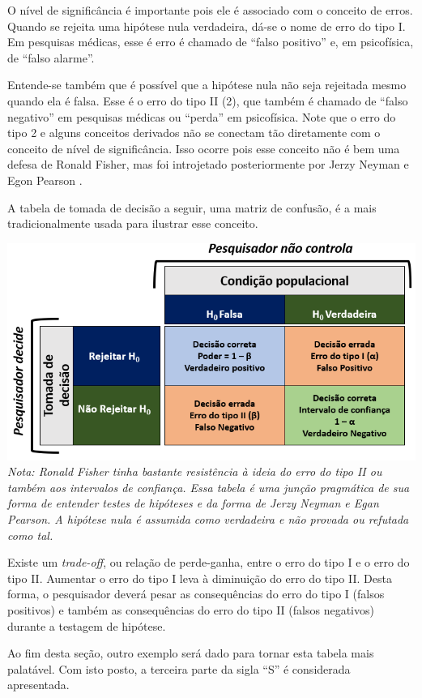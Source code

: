 \documentclass[
]{book}
\begin{document}
O nível de significância é importante pois ele é associado com o conceito de erros. Quando se rejeita uma hipótese nula verdadeira, dá-se o nome de erro do tipo I. Em pesquisas médicas, esse é erro é chamado de ``falso positivo'' e, em psicofísica, de ``falso alarme''.

Entende-se também que é possível que a hipótese nula não seja rejeitada mesmo quando ela é falsa. Esse é o erro do tipo II (2), que também é chamado de ``falso negativo'' em pesquisas médicas ou ``perda'' em psicofísica. Note que o erro do tipo 2 e alguns conceitos derivados não se conectam tão diretamente com o conceito de nível de significância. Isso ocorre pois esse conceito não é bem uma defesa de Ronald Fisher, mas foi introjetado posteriormente por Jerzy Neyman e Egon Pearson \citep{cohen2013explaining}.

A tabela de tomada de decisão a seguir, uma matriz de confusão, é a mais tradicionalmente usada para ilustrar esse conceito.

\includegraphics{./img/cap_inferencia_tabela_decisao.png}
\emph{Nota: Ronald Fisher tinha bastante resistência à ideia do erro do tipo II ou também aos intervalos de confiança. Essa tabela é uma junção pragmática de sua forma de entender testes de hipóteses e da forma de Jerzy Neyman e Egan Pearson. A hipótese nula é assumida como verdadeira e não provada ou refutada como tal.}

Existe um \emph{trade-off}, ou relação de perde-ganha, entre o erro do tipo I e o erro do tipo II. Aumentar o erro do tipo I leva à diminuição do erro do tipo II. Desta forma, o pesquisador deverá pesar as consequências do erro do tipo I (falsos positivos) e também as consequências do erro do tipo II (falsos negativos) durante a testagem de hipótese.

Ao fim desta seção, outro exemplo será dado para tornar esta tabela mais palatável. Com isto posto, a terceira parte da sigla ``S'' é considerada apresentada.
\end{document}
